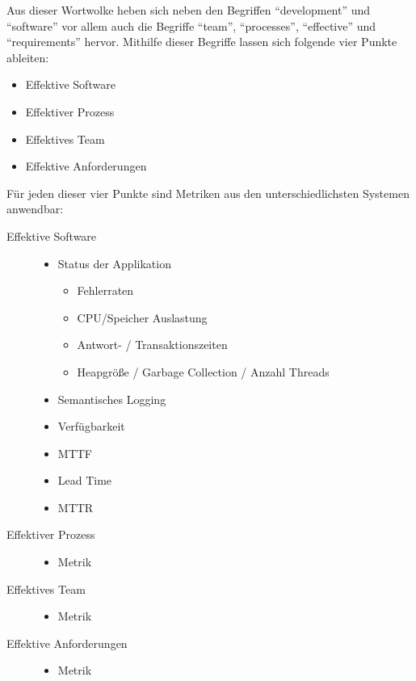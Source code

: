 Aus dieser Wortwolke heben sich neben den Begriffen ``development'' und ``software'' vor allem auch die Begriffe ``team'', ``processes'', ``effective'' und ``requirements'' hervor.
Mithilfe dieser Begriffe lassen sich folgende vier Punkte ableiten:

\begin{itemize}[noitemsep]
  \item Effektive Software
  \item Effektiver Prozess
  \item Effektives Team 
  \item Effektive Anforderungen 
\end{itemize}

Für jeden dieser vier Punkte sind Metriken aus den unterschiedlichsten Systemen anwendbar:

\begin{description}
  \item[Effektive Software] \hfill
  \begin{itemize}[noitemsep]
    \item Status der Applikation
    \begin{itemize}[noitemsep]
      \item Fehlerraten
      \item CPU/Speicher Auslastung
      \item Antwort- / Transaktionszeiten
      \item Heapgröße / Garbage Collection / Anzahl Threads
    \end{itemize}
    \item Semantisches Logging
    \item Verfügbarkeit
    \item \ac{MTTF}
    \item Lead Time
    \item \ac{MTTR}
  \end{itemize}
  \item[Effektiver Prozess] \hfill
  \begin{itemize}[noitemsep]
    \item Metrik
  \end{itemize}
  \item[Effektives Team] \hfill
  \begin{itemize}[noitemsep]
    \item Metrik
  \end{itemize}
  \item[Effektive Anforderungen] \hfill
  \begin{itemize}[noitemsep]
    \item Metrik
  \end{itemize}
\end{description}
